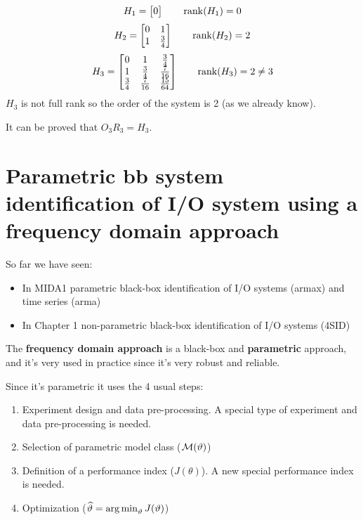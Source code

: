 \begin{example}
    \[
        H_1 = \begin{bmatrix}
            0
        \end{bmatrix}
        \qquad \operatorname*{rank} (H_1) = 0
    \]
    \[
        H_2 = \begin{bmatrix}
            0 & 1 \\
            1 & \frac{3}{4}
        \end{bmatrix}
        \qquad \operatorname*{rank} (H_2) = 2
    \]
    \[
        H_3 = \begin{bmatrix}
            0 & 1 & \frac{3}{4} \\
            1 & \frac{3}{4} & \frac{7}{16} \\
            \frac{3}{4} & \frac{7}{16} & \frac{15}{64}
        \end{bmatrix}
        \qquad \operatorname*{rank} (H_3) = 2 \neq 3
    \]
    $H_3$ is not full rank so the order of the system is 2 (as we already know). 
    
    It can be proved that $O_3R_3 = H_3$.
\end{example}

\chapter{Parametric \acrlong{bb} system identification of I/O system using a frequency domain approach}

So far we have seen:
\begin{itemize}
    \item In MIDA1 parametric black-box identification of I/O systems (\gls{armax}) and time series (\gls{arma})
    \item In Chapter 1 non-parametric black-box identification of I/O systems (4SID)
\end{itemize}

The \textbf{frequency domain approach} is a black-box and \textbf{parametric} approach, and it's very used in practice since it's very robust and reliable.

Since it's parametric it uses the 4 usual steps:
\begin{enumerate}
    \item Experiment design and data pre-processing. A special type of experiment and data pre-processing is needed.
    \item Selection of parametric model class ($\mathcal{M}(\vartheta)$)
    \item Definition of a performance index ($J(\theta)$). A new special performance index is needed.
    \item Optimization ($\widehat{\vartheta} = \operatorname*{arg\,min}_\vartheta J(\vartheta)$)
\end{enumerate}


